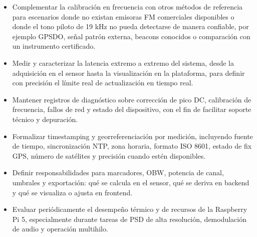 \begin{itemize}
  \item Complementar la calibración en frecuencia con otros métodos de referencia
  para escenarios donde no existan emisoras FM comerciales disponibles o donde el
  tono piloto de 19 kHz no pueda detectarse de manera confiable, por ejemplo
  GPSDO, señal patrón externa, beacons conocidos o comparación con un instrumento
  certificado.

  \item Medir y caracterizar la latencia extremo a extremo del sistema, desde la
  adquisición en el sensor hasta la visualización en la plataforma, para definir
  con precisión el límite real de actualización en tiempo real.

  \item Mantener registros de diagnóstico sobre corrección de pico DC, calibración
  de frecuencia, fallos de red y estado del dispositivo, con el fin de facilitar
  soporte técnico y depuración.

  \item Formalizar timestamping y georreferenciación por medición, incluyendo
  fuente de tiempo, sincronización NTP, zona horaria, formato ISO 8601, estado de
  fix GPS, número de satélites y precisión cuando estén disponibles.

  \item Definir responsabilidades para marcadores, OBW, potencia de canal,
  umbrales y exportación: qué se calcula en el sensor, qué se deriva en backend y
  qué se visualiza o ajusta en frontend.

  \item Evaluar periódicamente el desempeño térmico y de recursos de la Raspberry
  Pi 5, especialmente durante tareas de PSD de alta resolución, demodulación de
  audio y operación multihilo.
\end{itemize}
